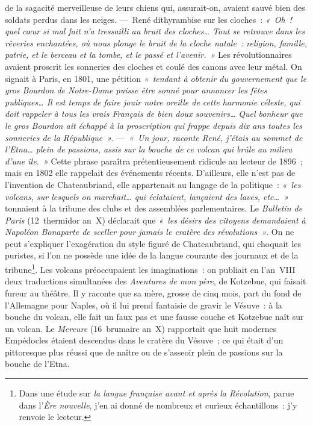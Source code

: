 \documentclass[french,twoside]{book} %
\begin{document}
\label{p598}de la sagacité merveilleuse de leurs chiens qui, assurait-on, avaient sauvé bien des soldats perdus dans les neiges. — René dithyrambise sur les cloches : \emph{« Oh ! quel cœur si mal fait n’a tressailli au bruit des cloches… Tout se retrouve dans les rêveries enchantées, où nous plonge le bruit de la cloche natale : religion, famille, patrie, et le berceau et la tombe, et le passé et l’avenir. »} Les révolutionnaires avaient proscrit les sonneries des cloches et coulé des canons avec leur métal. On signait à Paris, en 1801, une pétition \emph{« tendant à obtenir du gouvernement que le gros Bourdon de Notre-Dame puisse être sonné pour annoncer les fêtes publiques… Il est temps de faire jouir notre oreille de cette harmonie céleste, qui doit rappeler à tous les vrais Français de bien doux souvenirs… Quel bonheur que le gros Bourdon ait échappé à la proscription qui frappe depuis dix ans toutes les sonneries de la République ».} — \emph{« Un jour, raconte René, j’étais au sommet de l’Etna… plein de passions, assis sur la bouche de ce volcan qui brûle au milieu d’une île. »} Cette phrase paraîtra prétentieusement ridicule au lecteur de 1896 ; mais en 1802 elle rappelait des événements récents. D’ailleurs, elle n’est pas de l’invention de Chateaubriand, elle appartenait au langage de la politique : \emph{« les volcans, sur lesquels on marchait… qui éclataient, lançaient des laves, etc… »} tonnaient à la tribune des clubs et des assemblées parlementaires. Le \emph{Bulletin de Paris} (12 thermidor an X) déclarait que \emph{« les désirs des citoyens demandaient à Napoléon Bonaparte de sceller pour jamais le cratère des révolutions »}. On ne peut s’expliquer l’exagération du style figuré de Chateaubriand, qui choquait les puristes, si l’on ne possède une idée de la langue courante des journaux et de la tribune\footnote{Dans une étude sur \emph{la langue française avant et après la Révolution}, parue dans l’\emph{Ère nouvelle}, j’en ai donné de nombreux et curieux échantillons : j’y renvoie le lecteur.}. Les volcans préoccupaient les imaginations : on publiait en l’an VIII deux traductions simultanées des \emph{Aventures de mon père}, de Kotzebue, qui faisait fureur au théâtre. Il y raconte que sa mère, grosse de cinq mois, part du fond de l’Allemagne pour Naples, où il lui prend fantaisie de gravir le Vésuve : à la bouche du volcan, elle fait un faux pas et une fausse couche et Kotzebue naît sur un volcan. Le \emph{Mercure} (16 brumaire an X) rapportait que huit modernes Empédocles étaient descendus dans le cratère du Vésuve ; ce qui était d’un pittoresque plus réussi que de naître ou de s’asseoir plein de passions sur la bouche de l’Etna.  
\end{document}
